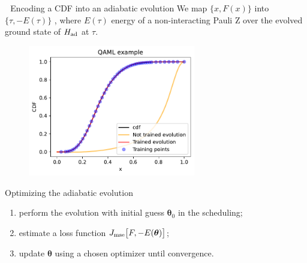 \documentclass[20pt, final]{beamer}
\newlength{\colwidth}
\begin{document}
\begin{frame}[t]
\begin{columns}[t]
\begin{column}{\colwidth}
\begin{block}{\faChain\,\, Encoding a CDF into an adiabatic evolution}
We map $\{x, F(x)\}$ into $\{\tau, -E(\tau)\}$ , where $E(\tau)$ energy of a 
non-interacting Pauli Z over the evolved ground state of $H_{\rm ad}$ at $\tau$.

\begin{figure}
    \includegraphics[width=0.65\textwidth]{figures/evolution.pdf}
\end{figure}
\end{block}

  \begin{alertblock}{Optimizing the adiabatic evolution}
  
  \begin{enumerate}
    \item perform the evolution with initial guess $\bm{\theta}_0$ in the scheduling;
    \item estimate a loss function $J_{\rm mse}\bigl[F, -E(\bm{\theta})\bigr]$;
    \item update $\bm{\theta}$ using a chosen optimizer until convergence.
  \end{enumerate}

  \end{alertblock}
  


\end{column}
\end{columns}
\end{frame}
\end{document}
